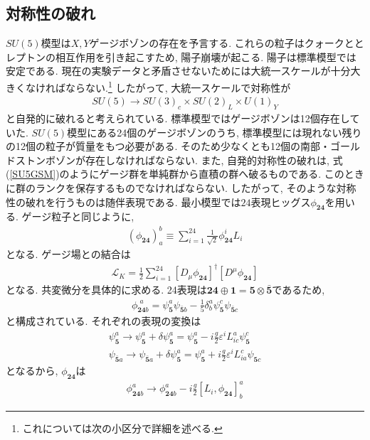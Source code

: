 \documentclass[uplatex,dvipdfmx,a4paper,titlepage]{jsbook}
\theoremstyle{plain}
\theoremstyle{definition}
\begin{document}
{\subsection{対称性の破れ}
$SU(5)$模型は$X, Y$ゲージボゾンの存在を予言する.
これらの粒子はクォークととレプトンの相互作用を引き起こすため, 陽子崩壊が起こる.
陽子は標準模型では安定である.
現在の実験データと矛盾させないためには大統一スケールが十分大きくなければならない.\footnote{これについては次の小区分で詳細を述べる.}
したがって, 大統一スケールで対称性が
\begin{align}
  SU(5)\rightarrow SU(3)_c\times SU(2)_L\times U(1)_Y\label{SU5GSM}
\end{align}
と自発的に破れると考えられている.
標準模型ではゲージボゾンは12個存在していた.
$SU(5)$模型にある24個のゲージボゾンのうち, 標準模型には現れない残りの12個の粒子が質量をもつ必要がある.
そのため少なくとも12個の南部・ゴールドストンボゾンが存在しなければならない.
また, 自発的対称性の破れは, 式(\ref{SU5GSM})のようにゲージ群を単純群から直積の群へ破るものである.
このときに群のランクを保存するものでなければならない.
したがって, そのような対称性の破れを行うものは随伴表現である.
最小模型では$24$表現ヒッグス$\phi_{\bm{24}}$を用いる.
ゲージ粒子と同じように, 
\begin{align}
  (\phi_{\bm{24}})_a^b \equiv \sum_{i=1}^{24}\frac{1}{\sqrt{2}}\phi_{\bm{24}}^i L_i
\end{align}
となる.
ゲージ場との結合は
\begin{align}
\mathcal{L}_K = \frac{1}{2}\sum_{i=1}^{24}[D_\mu\phi_{\bm{24}}]^\dagger [D^\mu\phi_{\bm{24}}]\nonumber
\end{align}
となる.
共変微分を具体的に求める.
24表現は$\bm{24}\oplus \bm{1} = \bm{5}\otimes \bar{\bm{5}}$であるため,
\begin{align}
  \phi_{\bm{24}b}^{\,\,a} = \psi_{\bm{5}}^a \psi_{\bm{\bar{5}}b} -\frac{1}{5}\delta^a_b \psi^c_{\bm{5}}\psi_{\bm{\bar{5}}c}
\end{align}
と構成されている.
それぞれの表現の変換は
\begin{align}
  \psi_{\bm{5}}^a \rightarrow \psi^a_{\bm{5}}+\delta \psi_{\bm{5}}^a = \psi_{\bm{5}}^a -i\frac{g}{2}\varepsilon^i L^a_{ic}\psi_{\bm{5}}^c \nonumber\\
  \psi_{\bm{\bar{5}}a} \rightarrow \psi_{\bm{\bar{5}}a}+\delta \psi_{\bm{5}}^a = \psi_{\bm{5}}^a +i\frac{g}{2}\varepsilon^i L^c_{ia}\psi_{\bm{5}c}\nonumber
\end{align}
となるから, $\phi_{\bm{24}}$は
\begin{align}
  \phi_{\bm{24}b}^a \rightarrow \phi_{\bm{24}b}^a -i\frac{g}{2}[L_i,\phi_{\bm{24}}]^a_b

\end{align}}
\end{document}
